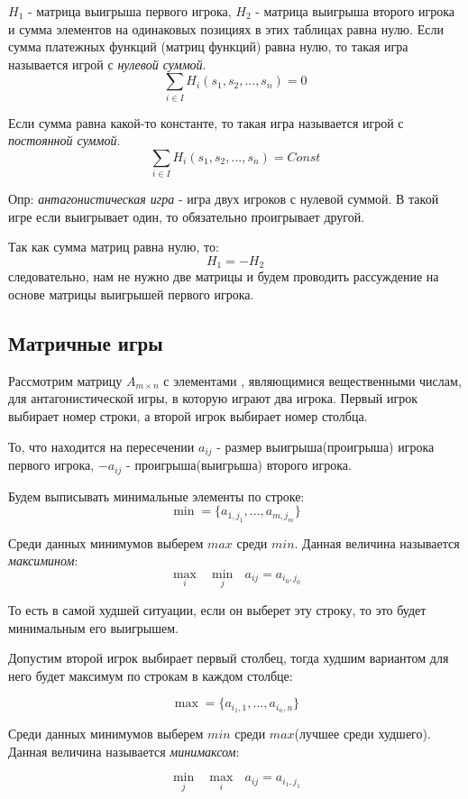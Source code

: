 \documentclass[aps,%
12pt,%
final,%
oneside,
onecolumn,%
musixtex, %
superscriptaddress,%
centertags]{article} %
\begin{document}
$H_1$ - матрица выигрыша первого игрока, $H_2$ - матрица выигрыша второго игрока и сумма элементов на одинаковых позициях в этих таблицах равна нулю.
Если сумма платежных функций (матриц функций) равна нулю, то такая игра называется игрой с \textit{нулевой суммой}.
$$\sum_{i \in I}{H_{i} (s_1,s_2, ..., s_n) = 0}$$ 

Если сумма равна какой-то константе, то такая игра называется игрой с \textit{постоянной суммой}.
$$\sum_{i \in I}{H_{i} (s_1,s_2, ..., s_n) = Const}$$ 

Опр: \textit{антагонистическая игра} - игра двух игроков с нулевой суммой. В такой игре если выигрывает один, то обязательно проигрывает другой.

Так как сумма матриц равна нулю, то: 
$$H_1 = -H_2 $$
следовательно, нам не нужно две матрицы и будем проводить рассуждение на основе матрицы выигрышей первого игрока.

\subsection{Матричные игры}

Рассмотрим матрицу $ A_{m \times n}$ с элементами , являющимися вещественными числам, для антагонистической игры, в которую играют два игрока. Первый игрок выбирает номер строки, а второй игрок выбирает номер столбца. 

То, что находится на пересечении $a_{ij}$ - размер выигрыша(проигрыша) игрока первого игрока, $-a_{ij}$ - проигрыша(выигрыша) второго игрока.

Будем выписывать минимальные элементы по строке: 
$$ \min = \{a_{1,j_1}, ... , a_{m,j_m}\}$$

Среди данных минимумов выберем $max$ среди $min$. Данная величина называется \textit{максимином}:
$$ \underset{i}{\max} \text{ } \underset{j}{\min} \text{ } a_{ij} = a_{i_0,j_0}$$

То есть в самой худшей ситуации, если он выберет эту строку, то это будет минимальным его выигрышем.

Допустим второй игрок выбирает первый столбец, тогда худшим вариантом для него будет максимум по строкам в каждом столбце:

$$ \max = \{a_{i_1,1}, ... , a_{i_n,n}\}$$

Среди данных минимумов выберем $min$ среди $max$(лучшее среди худшего). Данная величина называется \textit{минимаксом}:

$$ \underset{j}{\min} \text{ }\underset{i}{\max} \text{ } a_{ij} = a_{i_1,j_1} $$
\end{document}
